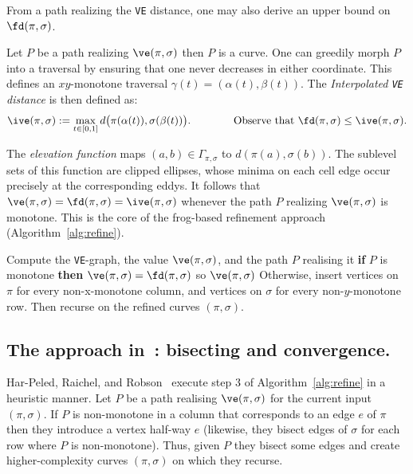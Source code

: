 \noindent
From a path realizing the \texttt{VE} distance, one may also derive an upper bound on $\fd(\pi, \sigma)$.

\begin{definition}
    Let $P$ be a path realizing $\ve(\pi,\sigma)$ then $P$ is a curve. One can greedily morph $P$ into a traversal by ensuring that one never decreases in either coordinate. This defines an $xy$-monotone traversal $\gamma(t) = (\alpha(t), \beta(t))$.
    The \emph{Interpolated \texttt{VE} distance} is then defined as:
    \[
        \ive(\pi, \sigma)
        := \max_{t \in [0,1]} d\bigl(\pi(\alpha(t)), \sigma(\beta(t))\bigr).
        \qquad\qquad
        \text{Observe that } \fd(\pi,\sigma) \le \ive(\pi,\sigma).
    \]
\end{definition}

The \emph{elevation function} maps $(a,b) \in \Gamma_{\pi, \sigma}$ to $d(\pi(a), 
\sigma(b))$.
The sublevel sets of this function are clipped ellipses, whose minima on each cell edge occur precisely at the corresponding eddys.
It follows that $\ve(\pi,\sigma) = \fd(\pi, \sigma) = \ive(\pi, \sigma) $ whenever the path $P$ realizing $\ve(\pi,\sigma)$ is monotone.
This is the core of the frog-based refinement approach (Algorithm~\ref{alg:refine}).


\begin{algorithm}[H]
\caption{Refinement Procedure from~\cite{harpeled_et_al:LIPIcs.SoCG.2025.54}}
\label{alg:refine}
\begin{algorithmic}[1]
  \State Compute the \texttt{VE}-graph, the value $\ve(\pi,\sigma)$, and the path $P$ realising it
  \State \textbf{if} $P$ is monotone \textbf{then} $\ve(\pi,\sigma) = \fd(\pi, \sigma)$ so \Return $\ve(\pi,\sigma)$
  \State Otherwise, insert vertices on $\pi$ for every non-x-monotone column, and vertices on $\sigma$ for every non-$y$-monotone row. Then recurse on the refined curves $(\pi,\sigma)$.
\end{algorithmic}
\end{algorithm}

\subsection{The approach in~\cite{harpeled_et_al:LIPIcs.SoCG.2025.54}: bisecting and convergence.}
Har-Peled, Raichel, and Robson~\cite{harpeled_et_al:LIPIcs.SoCG.2025.54} execute step 3 of Algorithm~\ref{alg:refine} in a heuristic manner.  
Let $P$ be a path realising $\ve(\pi, \sigma)$ for the current input $(\pi, \sigma)$. 
If $P$ is non-monotone in a column that corresponds to an edge $e$ of $\pi$ then they introduce a vertex half-way $e$ (likewise, they bisect edges of $\sigma$ for each row where $P$ is non-monotone). 
Thus, given $P$ they bisect some edges and create higher-complexity curves $(\pi, \sigma)$ on which they recurse.

